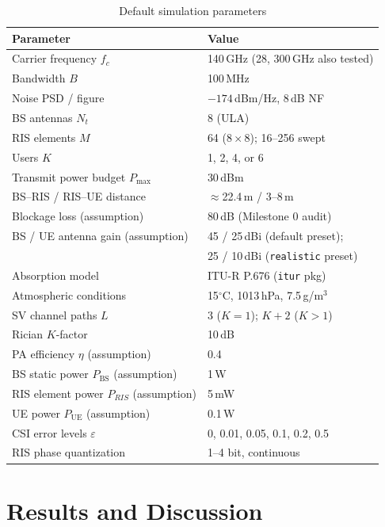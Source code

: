 \documentclass[conference]{IEEEtran}
\newcommand{\IRS}{RIS}
\begin{document}
\begin{table}[t]
\centering
\caption{Default simulation parameters}
\label{tab:params}
\begin{tabular}{@{}ll@{}}
\toprule
Parameter & Value \\
\midrule
Carrier frequency $f_c$ & 140\,GHz (28, 300\,GHz also tested) \\
Bandwidth $B$ & 100\,MHz \\
Noise PSD / figure & $-174$\,dBm/Hz, 8\,dB NF \\
BS antennas $N_t$ & 8 (ULA) \\
\IRS{} elements $M$ & 64 ($8{\times}8$); 16--256 swept \\
Users $K$ & 1, 2, 4, or 6 \\
Transmit power budget $P_{\max}$ & 30\,dBm \\
BS--\IRS{} / \IRS{}--UE distance & $\approx$22.4\,m / 3--8\,m \\
Blockage loss (assumption) & 80\,dB (Milestone 0 audit) \\
BS / UE antenna gain (assumption) & 45 / 25\,dBi (default preset);\\
 & 25 / 10\,dBi (\texttt{realistic} preset) \\
Absorption model & ITU-R P.676 (\texttt{itur} pkg) \\
Atmospheric conditions & 15$^\circ$C, 1013\,hPa, 7.5\,g/m$^3$ \\
SV channel paths $L$ & 3 ($K{=}1$); $K{+}2$ ($K{>}1$) \\
Rician $K$-factor & 10\,dB \\
PA efficiency $\eta$ (assumption) & 0.4 \\
BS static power $P_{\mathrm{BS}}$ (assumption) & 1\,W \\
\IRS{} element power $P_{\IRS{}}$ (assumption) & 5\,mW \\
UE power $P_{\mathrm{UE}}$ (assumption) & 0.1\,W \\
CSI error levels $\varepsilon$ & 0, 0.01, 0.05, 0.1, 0.2, 0.5 \\
\IRS{} phase quantization & 1--4 bit, continuous \\
\bottomrule
\end{tabular}
\end{table}

\section{Results and Discussion}
\label{sec:results}
\end{document}
